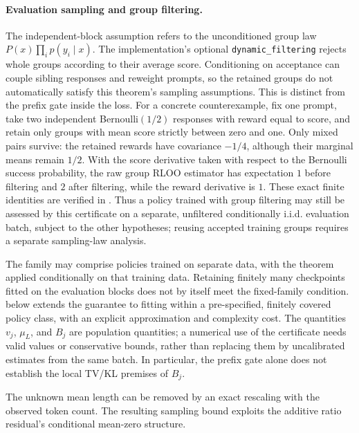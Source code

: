\paragraph{Evaluation sampling and group filtering.}
The independent-block assumption refers to the unconditioned group law
$P(x)\prod_i p(y_i\mid x)$. The implementation's optional
\texttt{dynamic\_filtering} rejects whole groups according to their average
score. Conditioning on acceptance can couple sibling responses and reweight
prompts, so the retained groups do not automatically satisfy this theorem's
sampling assumptions. This is distinct from the prefix gate inside the loss.
For a concrete counterexample, fix one prompt, take two independent
Bernoulli$(1/2)$ responses with reward equal to score, and retain only groups
with mean score strictly between zero and one. Only mixed pairs survive:
the retained rewards have covariance $-1/4$, although their marginal means
remain $1/2$. With the score derivative taken with respect to the Bernoulli
success probability, the raw group RLOO estimator has expectation $1$
before filtering and $2$ after filtering, while the reward derivative is $1$.
These exact finite identities are verified in
. Thus a policy trained with group filtering
may still be assessed by this certificate on a separate, unfiltered
conditionally i.i.d. evaluation batch, subject to the other hypotheses;
reusing accepted training groups requires a separate sampling-law analysis.

The family may comprise policies trained on separate data, with the theorem
applied conditionally on that training data. Retaining finitely many checkpoints
fitted on the evaluation blocks does not by itself meet the fixed-family
condition.  below extends the guarantee
to fitting within a pre-specified, finitely covered policy class, with an
explicit approximation and complexity cost. The quantities $v_j$,
$\mu_L$, and $B_j$ are population quantities; a numerical use of the
certificate needs valid values or conservative bounds, rather than replacing
them by uncalibrated estimates from the same batch. In particular, the
prefix gate alone does not establish the local TV/KL premises of $B_j$.

The unknown mean length can be removed by an exact rescaling with the
observed token count. The resulting sampling bound exploits the additive
ratio residual's conditional mean-zero structure.

